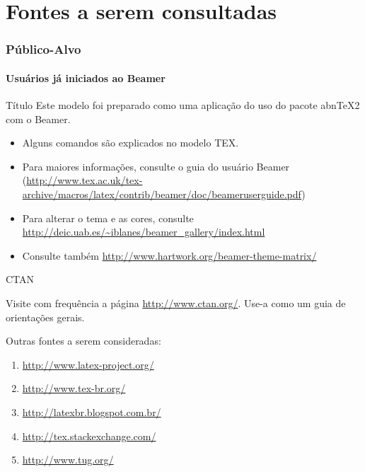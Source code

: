 \documentclass[aspectratio=43]{beamer}
\begin{document}
\section{Fontes a serem consultadas}
\begin{frame}
\frametitle{Público-Alvo}
\framesubtitle{Usuários já iniciados ao Beamer}

\begin{block}{Título}
 Este modelo foi preparado como uma aplicação do uso do pacote abnTeX2 com o 
 Beamer.
\end{block}

\begin{itemize}
 \item Alguns comandos são explicados no modelo TEX. \pause
 
 \item Para maiores informações, consulte o guia do usuário Beamer 
 (\url{http://www.tex.ac.uk/tex-archive/macros/latex/contrib/beamer/doc/beameruserguide.pdf})\pause
 
 \item Para alterar o tema e as cores, consulte 
 \url{http://deic.uab.es/~iblanes/beamer_gallery/index.html}
 
 \item Consulte também \url{http://www.hartwork.org/beamer-theme-matrix/}
\end{itemize}

\end{frame}

\begin{frame}{CTAN}

Visite com frequência a página \url{http://www.ctan.org/}. 
Use-a como um guia de orientações gerais.
\vspace{0.7cm}

Outras fontes a serem consideradas:
\begin{enumerate}
 \item \url{http://www.latex-project.org/}
 \item \url{http://www.tex-br.org/}
 \item \url{http://latexbr.blogspot.com.br/}
 \item \url{http://tex.stackexchange.com/}
 \item \url{http://www.tug.org/}
\end{enumerate}

\end{frame}

\begin{frame}


\end{frame}
\end{document}
